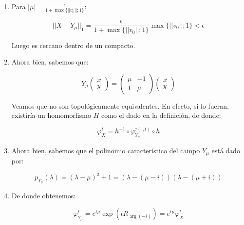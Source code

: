 \begin{exmp}
\begin{enumerate}
		Donde $||v_0|| = \max_{(x,y)^t\in K}||(x,y)||$, cuya existencia está garantizada por la continuidad de la norma en un compacto.
		
		\item Para $|\mu|=\frac{\epsilon}{1 + \max \{||v_0||; 1\}}$:
		
		\begin{equation*}
			||X-Y_\mu|| _1 = \frac{\epsilon}{1 + \max \{||v_0||; 1\}} \max \{||v_0||; 1\} < \epsilon
		\end{equation*}
		
		Luego es cercano dentro de un compacto.
		
		\item Ahora bien, sabemos que:
		
		\begin{equation*}
			Y_\mu\begin{pmatrix}
				x\\
				y
			\end{pmatrix}=\begin{pmatrix}
				\mu &-1\\
				1  &\mu 
			\end{pmatrix}\begin{pmatrix}
				x\\
				y
			\end{pmatrix}
		\end{equation*}
		
		Veamos que no son topológicamente equivalentes. En efecto, si lo fueran, existiría un homomorfismo $H$ como el dado en la definición, de donde:
		
		\begin{equation*}
			\varphi_X^{t} = h^{-1}\circ\varphi_{Y_\mu}^{\tau(\cdot,t)} \circ h
		\end{equation*}
		
		\item Ahora bien, sabemos que el polinomio característico del campo $Y_\mu$ está dado por:
		
		\begin{equation*}
			p_{Y_\mu}(\lambda) = (\lambda-\mu)^2+1=(\lambda-(\mu-i))(\lambda-(\mu+i)) 
		\end{equation*}
		
		\item De donde obtenemos:
		
		\begin{equation*}
			\varphi_{Y_\mu}^t = e^{t\mu}\exp(tR_{\arg(-i)})= e^{t\mu}\varphi_X^t
		\end{equation*}
		

\end{enumerate}
\end{exmp}
